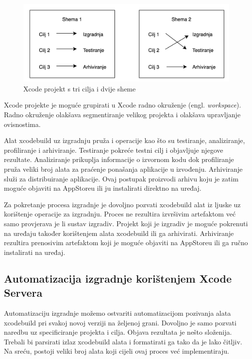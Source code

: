 \documentclass[times, utf8, diplomski, numeric]{fer}
\newcommand{\eng}[1]{(engl. \textit{#1})}
\begin{document}
\begin{figure}
    \centering
    \includegraphics[scale=0.5]{TargetScheme}
    \caption{Xcode projekt s tri cilja i dvije sheme}
    \label{fig:TargetScheme}
\end{figure}

Xcode projekte je moguće grupirati u Xcode radno okruženje \eng{workspace}. Radno okruženje olakšava segmentiranje velikog projekta i olakšava upravljanje ovisnostima.

Alat xcodebuild uz izgradnju pruža i operacije kao što su testiranje, analiziranje, profiliranje i arhiviranje. Testiranje pokreće testni cilj i objavljuje njegove rezultate. Analiziranje prikuplja informacije o izvornom kodu dok profiliranje pruža veliki broj alata za praćenje ponašanja aplikacije u izvođenju. Arhiviranje služi za distribuiranje aplikacije. Ovaj postupak proizvodi arhivu koju je zatim moguće objaviti na AppStoreu ili ju instalirati direktno na uređaj.

Za pokretanje procesa izgradnje je dovoljno pozvati xcodebuild alat iz ljuske uz korištenje operacije za izgradnju. Proces ne rezultira izvršivim artefaktom već samo provjerava je li sustav izgradiv. Projekt koji je izgradiv je moguće pokrenuti na uređaju također korištenjem alata xcodebuild ili ga arhivirati. Arhiviranje rezultira prenosivim artefaktom koji je moguće objaviti na AppStoreu ili ga ručno instalirati na uređaj.

\subsection{Automatizacija izgradnje korištenjem Xcode Servera}

Automatizaciju izgradnje možemo ostvariti automatizacijom pozivanja alata xcodebuild pri svakoj novoj verziji na željenoj grani. Dovoljno je samo pozvati naredbu uz specificiranje projekta i cilja. Objava rezultata je nešto složenija. Trebali bi parsirati izlaz xcodebuild alata i formatirati ga tako da je lako čitljiv. Na sreću, postoji veliki broj alata koji cijeli ovaj proces već implementiraju.
\end{document}
